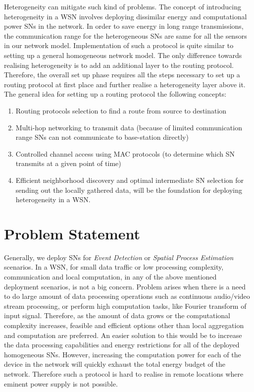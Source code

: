 Heterogeneity can mitigate such kind of problems. The concept of introducing heterogeneity in a \ac{WSN} involves deploying dissimilar energy and computational power \acp{SN} in the network. In order to save energy in long range transmissions, the communication range for the heterogeneous \acp{SN} are same for all the sensors in our network model. Implementation of such a protocol is quite similar to setting up a general homogeneous network model. The only difference towards realising heterogeneity is to add an additional layer to the routing protocol. Therefore, the overall set up phase requires all the steps necessary to set up a routing protocol at first place and further realise a heterogeneity layer above it. The general idea for setting up a routing protocol  the following concepts:

\begin{enumerate}
    \item Routing protocols selection to find a route from source to destination
    
    \item Multi-hop networking to transmit data (because of limited communication range \acp{SN} can not communicate to base-station directly)
    
    \item Controlled channel access using \ac{MAC} protocols (to determine which \ac{SN} transmits at a given point of time)
    
    \item Efficient neighborhood discovery and optimal intermediate \ac{SN} selection for sending out the locally gathered data, will be the foundation for deploying heterogeneity in a \ac{WSN}.
\end{enumerate}


\section{Problem Statement}


Generally, we deploy \acp{SN} for \textit{Event Detection} or \textit{Spatial Process Estimation} scenarios.  In a \acf{WSN}, for small data traffic or low processing complexity, communication and local computation, in any of the above mentioned deployment scenarios, is not a big concern. Problem arises when there is a need to do large amount of data processing operations such as continuous audio/video stream processing, or perform high computation tasks, like Fourier transform of input signal. Therefore, as the amount of data grows or the computational complexity increases, feasible and efficient options other than local aggregation and computation are preferred. An easier solution to this would be to increase the data processing capabilities and energy restrictions for all of the deployed homogeneous \acp{SN}. However, increasing the computation power for each of the device in the network will quickly exhaust the total energy budget of the network. Therefore such a protocol is hard to realise in remote locations where eminent power supply is not possible. 


